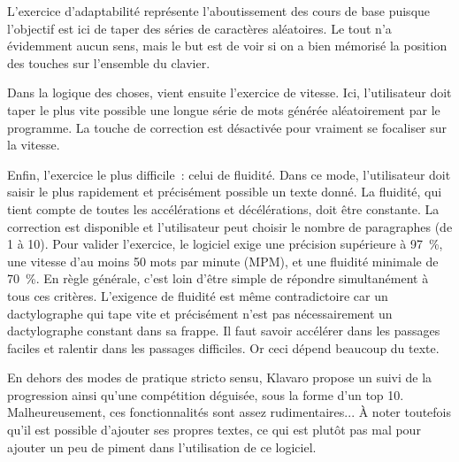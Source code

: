 \documentclass[a4paper,12pt]{article}
\begin{document}
L'exercice d'adaptabilité représente l'aboutissement des cours de base puisque l'objectif est ici de taper des séries de caractères aléatoires. Le tout n'a évidemment aucun sens, mais le but est de voir si on a bien mémorisé la position des touches sur l'ensemble du clavier.

Dans la logique des choses, vient ensuite l'exercice de vitesse. Ici, l'utilisateur doit taper le plus vite possible une longue série de mots générée aléatoirement par le programme. La touche de correction est désactivée pour vraiment se focaliser sur la vitesse.

Enfin, l'exercice le plus difficile~: celui de fluidité. Dans ce mode, l'utilisateur doit saisir le plus rapidement et précisément possible un texte donné. La fluidité, qui tient compte de toutes les accélérations et décélérations, doit être constante. La correction est disponible et l'utilisateur peut choisir le nombre de paragraphes (de 1 à 10). Pour valider l'exercice, le logiciel exige une précision supérieure à 97~\%, une vitesse d'au moins 50 mots par minute (MPM), et une fluidité minimale de 70~\%. En règle générale, c'est loin d'être simple de répondre simultanément à tous ces critères. L'exigence de fluidité est même contradictoire car un dactylographe qui tape vite et précisément n'est pas nécessairement un dactylographe constant dans sa frappe. Il faut savoir accélérer dans les passages faciles et ralentir dans les passages difficiles. Or ceci dépend beaucoup du texte.

En dehors des modes de pratique stricto sensu, Klavaro propose un suivi de la progression ainsi qu'une compétition déguisée, sous la forme d'un top 10. Malheureusement, ces fonctionnalités sont assez rudimentaires... À noter toutefois qu'il est possible d'ajouter ses propres textes, ce qui est plutôt pas mal pour ajouter un peu de piment dans l'utilisation de ce logiciel.
\end{document}

